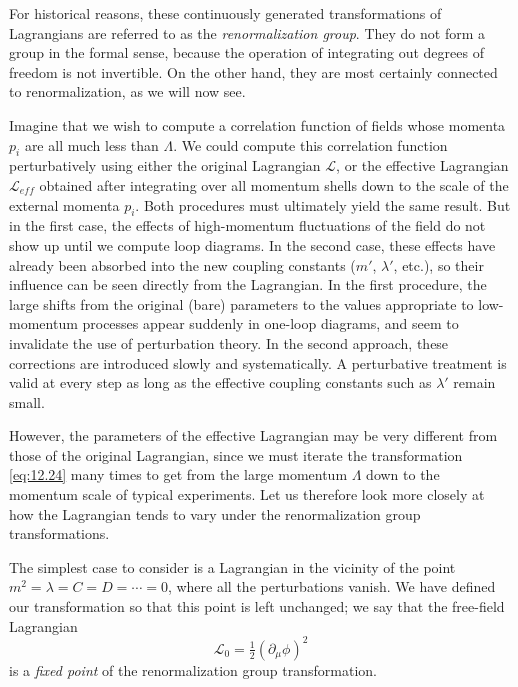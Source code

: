 For historical reasons, these continuously generated transformations of
Lagrangians are referred to as the \emph{renormalization group}.  They do not
form a group in the formal sense, because the operation of integrating out
degrees of freedom is not invertible.  On the other hand, they are most
certainly connected to renormalization, as we will now see.

Imagine that we wish to compute a correlation function of fields whose momenta
$p_i$ are all much less than $\Lambda$.  We could compute this correlation
function perturbatively using either the original Lagrangian $\mathcal{L}$, or
the effective Lagrangian $\mathcal{L}_{eff}$ obtained after integrating over
all momentum shells down to the scale of the external momenta $p_i$.  Both
procedures must ultimately yield the same result.  But in the first case, the
effects of high-momentum fluctuations of the field do not show up until we
compute loop diagrams.  In the second case, these effects have already been
absorbed into the new coupling constants ($m'$, $\lambda'$, etc.), so their
influence can be seen directly from the Lagrangian.  In the first procedure,
the large shifts from the original (bare) parameters to the values
appropriate to low-momentum processes appear suddenly in one-loop diagrams,
and seem to invalidate the use of perturbation theory.  In the second
approach, these corrections are introduced slowly and systematically.  A
perturbative treatment is valid at every step as long as the effective
coupling constants such as $\lambda'$ remain small.

However, the parameters of the effective Lagrangian may be very different from
those of the original Lagrangian, since we must iterate the transformation
\eqref{eq:12.24} many times to get from the large momentum $\Lambda$ down to
the momentum scale of typical experiments.  Let us therefore look more
closely at how the Lagrangian tends to vary under the renormalization group
transformations.

The simplest case to consider is a Lagrangian in the vicinity of the point
$m^2 = \lambda = C = D = \cdots = 0$, where all the perturbations vanish.  We
have defined our transformation so that this point is left unchanged; we say
that the free-field Lagrangian
\begin{equation}
  \mathcal{L}_0 = \tfrac{1}{2}(\partial_\mu\phi)^2
  \label{eq:12.25}
\end{equation}
is a \emph{fixed point} of the renormalization group transformation.

